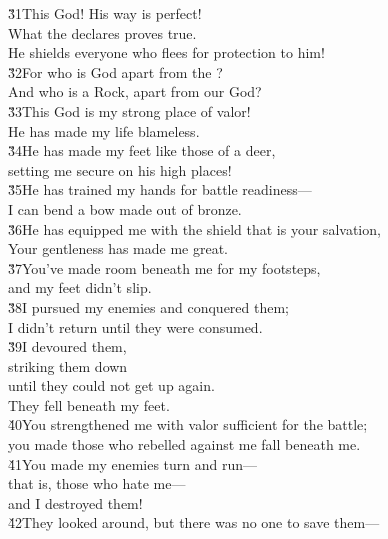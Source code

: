 \begin{poetry}
\poeml \v{31}This God! His way is perfect! \\
\poemll    What the  declares proves true. \\
\poemlll       He shields everyone who flees for protection to him! \\
\poeml \v{32}For who is God apart from the ? \\
\poemll    And who is a Rock, apart from our God? \\
\poeml \v{33}This God is my strong place of valor! \\
\poemll    He has made my life blameless. \\
\poeml \v{34}He has made my feet like those of a deer, \\
\poemll    setting me secure on his high places! \\
\poeml \v{35}He has trained my hands for battle readiness--- \\
\poemll    I can bend a bow made out of bronze. \\
\poeml \v{36}He has equipped me with the shield that is your salvation, \\
\poemll    Your gentleness has made me great. \\
\poeml \v{37}You've made room beneath me for my footsteps, \\
\poemll    and my feet didn't slip. \\
\poeml \v{38}I pursued my enemies and conquered them; \\
\poemll    I didn't return until they were consumed. \\
\poeml \v{39}I devoured them, \\
\poemll    striking them down \\
\poeml until they could not get up again. \\
\poemll    They fell beneath my feet. \\
\poeml \v{40}You strengthened me with valor sufficient for the battle; \\
\poemll    you made those who rebelled against me fall beneath me. \\
\poeml \v{41}You made my enemies turn and run--- \\
\poemll    that is, those who hate me--- \\
\poemlll       and I destroyed them! \\
\poeml \v{42}They looked around, but there was no one to save them--- \\

\end{poetry}
